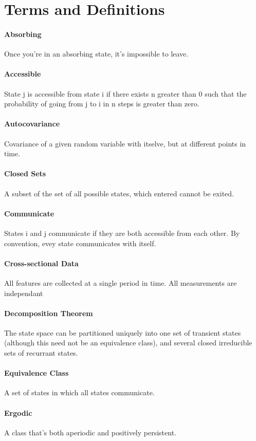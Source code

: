 \documentclass[12pt]{article}
\begin{document}
    \section{Terms and Definitions}
    \paragraph{Absorbing} Once you're in an absorbing state, it's impossible to leave.
    \paragraph{Accessible} State j is accessible from state i if there exists n greater than 0 such that the probability of going from j to i in n steps is greater than zero.
    \paragraph{Autocovariance} Covariance of a given random variable with itselve, but at different points in time.
    \paragraph{Closed Sets} A subset of the set of all possible states, which entered cannot be exited.
    \paragraph{Communicate} States i and j communicate if they are both accessible from each other. By convention, evey state communicates with itself.
    \paragraph{Cross-sectional Data} All features are collected at a single period in time. All measurements are independant
    \paragraph{Decomposition Theorem} The state space can be partitioned uniquely into one set of transient states (although this need not be an equivalence class), and several closed irreducible sets of recurrant states.
    \paragraph{Equivalence Class} A set of states in which all states communicate.
    \paragraph{Ergodic} A class that's both aperiodic and positively persistent.
\end{document}
